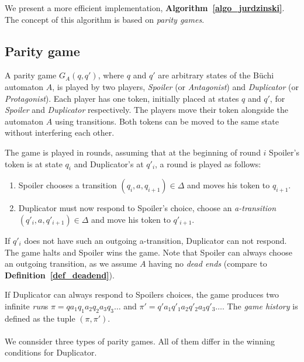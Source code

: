 \documentclass[12pt,oneside,bibliography=totoc,abstracton]{scrartcl}
\newcommand{\algoref}[1]{\textbf{Algorithm~\ref{#1}}}
\newcommand{\defref}[1]{\textbf{Definition~\ref{#1}}}
\begin{document}
We present a more efficient implementation, \algoref{algo_jurdzinski}.
The concept of this algorithm is based on \textit{parity games}.

\subsection{Parity game}
A parity game $G_A(q, q')$, where $q$ and $q'$ are arbitrary states of the Büchi automaton $A$, is played by two players,
\textit{Spoiler} (or \textit{Antagonist}) and \textit{Duplicator} (or \textit{Protagonist}). Each player has one token,
initially placed at states $q$ and $q'$, for \textit{Spoiler} and \textit{Duplicator} respectively.
The players move their token alongside the automaton $A$ using transitions. Both tokens can be moved to the same state
without interfering each other.

The game is played in rounds, assuming that at the beginning of round $i$ Spoiler's token is at state $q_i$
and Duplicator's at $q'_i$, a round is played as follows:
\begin{enumerate}
	\item Spoiler chooses a transition $(q_i, a, q_{i + 1}) \in \Delta$ and moves his token to $q_{i + 1}$.
	\item Duplicator must now respond to Spoiler's choice, choose an \textit{a-transition} $(q'_i, a, q'_{i + 1}) \in \Delta$ and move
		his token to $q'_{i + 1}$.
\end{enumerate}
If $q'_i$ does not have such an outgoing a-transition, Duplicator can not respond.
The game halts and Spoiler wins the game.
Note that Spoiler can always choose an outgoing transition, as we assume
$A$ having no \textit{dead ends} (compare to \defref{def_deadend}).

If Duplicator can always respond to Spoilers choices, the game produces two infinite \textit{run}s
$\pi = qa_1q_1a_2q_2a_3q_3 \ldots$ and $\pi' = q'a_1q'_1a_2q'_2a_3q'_3 \ldots$.
The \textit{game history} is defined as the tuple $(\pi, \pi')$.\\\\
We connsider three types of parity games. All of them differ in the winning conditions for Duplicator.

\newpage
\end{document}
